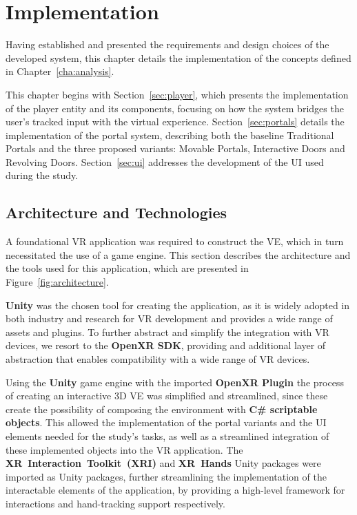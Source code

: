 
%

\chapter{Implementation}
\label{cha:implementation}

Having established and presented the requirements and design choices of the developed system, this chapter details the implementation of the concepts 
defined in Chapter~\ref{cha:analysis}. 

This chapter begins with Section~\ref{sec:player}, which presents the implementation of the player entity and its components, focusing on how the system 
bridges the user's tracked input with the virtual experience. Section~\ref{sec:portals} details the implementation of the portal system, describing both the 
baseline Traditional Portals and the three proposed variants: Movable Portals, Interactive Doors and Revolving Doors. Section~\ref{sec:ui} addresses the development of the \gls{UI} used during the study.

\section{Architecture and Technologies}
\label{sec:architecture-and-tech}

A foundational \gls{VR} application was required to construct the \gls{VE}, which in turn necessitated the use of a game engine.
This section describes the architecture and the tools used for this application, 
which are presented in Figure~\ref{fig:architecture}.

\textbf{Unity} 
was the chosen tool for creating the application, as it is widely adopted in both industry and research for \gls{VR} development and provides 
a wide range of assets and plugins. To further abstract and simplify the integration with \gls{VR} devices, we resort to the \textbf{OpenXR SDK}, 
providing and additional layer of abstraction that enables compatibility with a wide range of \gls{VR} devices.

Using the \textbf{Unity} game engine with the imported \textbf{OpenXR Plugin} the process of creating an interactive 3D \gls{VE} was simplified and streamlined, 
since these create the possibility of composing the environment with \textbf{C\# scriptable objects}. This allowed the implementation of the portal 
variants and the UI elements needed for the study's tasks, as well as a streamlined integration of these implemented objects into the \gls{VR} 
application. The \textbf{XR~Interaction~Toolkit~(XRI)} and \textbf{XR~Hands} Unity packages were imported as Unity packages, further streamlining 
the implementation of the interactable elements of the application, by providing a high-level framework for interactions and 
hand-tracking support respectively.

